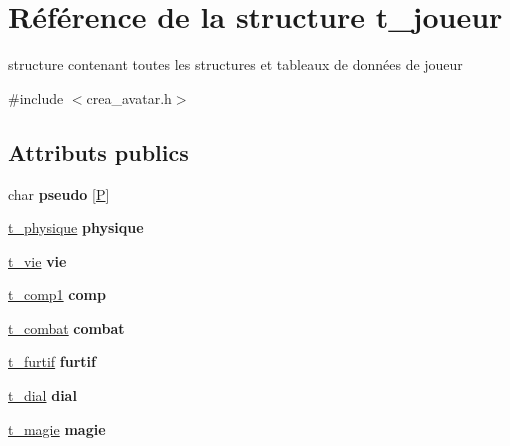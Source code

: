 \hypertarget{structt__joueur}{\section{Référence de la structure t\-\_\-joueur}
\label{structt__joueur}
}


structure contenant toutes les structures et tableaux de données de joueur  




{\ttfamily \#include $<$crea\-\_\-avatar.\-h$>$}

\subsection*{Attributs publics}
\begin{DoxyCompactItemize}
\item 
\hypertarget{structt__joueur_a16617a5307e61c31d1ae8beecbf312a9}{char {\bfseries pseudo} \mbox{[}\hyperlink{crea__avatar_8h_a2748566f4c443ee77aa831e63dbb5ebe}{P}\mbox{]}}\label{structt__joueur_a16617a5307e61c31d1ae8beecbf312a9}

\item 
\hypertarget{structt__joueur_a6326f0173af2f6ddc9fc8b676a436491}{\hyperlink{structt__physique}{t\-\_\-physique} {\bfseries physique}}\label{structt__joueur_a6326f0173af2f6ddc9fc8b676a436491}

\item 
\hypertarget{structt__joueur_a26b90c3faa594d481e0d7a47c8994147}{\hyperlink{structt__vie}{t\-\_\-vie} {\bfseries vie}}\label{structt__joueur_a26b90c3faa594d481e0d7a47c8994147}

\item 
\hypertarget{structt__joueur_a1865e45fd49d02f0bc5ddc3b7c2e361f}{\hyperlink{structt__comp1}{t\-\_\-comp1} {\bfseries comp}}\label{structt__joueur_a1865e45fd49d02f0bc5ddc3b7c2e361f}

\item 
\hypertarget{structt__joueur_a5db316622e32b30f25551a0b55b74eb5}{\hyperlink{structt__combat}{t\-\_\-combat} {\bfseries combat}}\label{structt__joueur_a5db316622e32b30f25551a0b55b74eb5}

\item 
\hypertarget{structt__joueur_aa54f9f99d71e8187c04c09fd94c0e295}{\hyperlink{structt__furtif}{t\-\_\-furtif} {\bfseries furtif}}\label{structt__joueur_aa54f9f99d71e8187c04c09fd94c0e295}

\item 
\hypertarget{structt__joueur_adca01bb0926d2e529ddd5b65f3e46713}{\hyperlink{structt__dial}{t\-\_\-dial} {\bfseries dial}}\label{structt__joueur_adca01bb0926d2e529ddd5b65f3e46713}

\item 
\hypertarget{structt__joueur_aafe5bc64604df01a3f8157bbcafb411a}{\hyperlink{structt__magie}{t\-\_\-magie} {\bfseries magie}}\label{structt__joueur_aafe5bc64604df01a3f8157bbcafb411a}

\end{DoxyCompactItemize}


